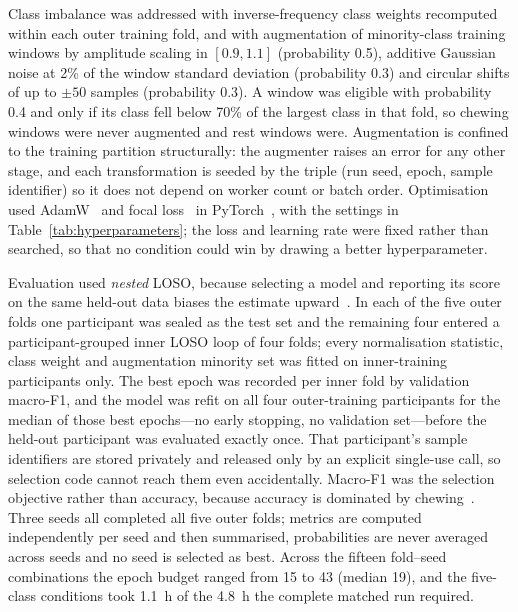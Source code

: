 \documentclass[pdflatex,sn-nature,iicol]{sn-jnl}
\begin{document}
Class imbalance was addressed with inverse-frequency class weights recomputed within each outer training fold, and with augmentation of minority-class training windows by amplitude scaling in $[0.9, 1.1]$ (probability 0.5), additive Gaussian noise at 2\% of the window standard deviation (probability 0.3) and circular shifts of up to $\pm50$ samples (probability 0.3). A window was eligible with probability 0.4 and only if its class fell below 70\% of the largest class in that fold, so chewing windows were never augmented and rest windows were. Augmentation is confined to the training partition structurally: the augmenter raises an error for any other stage, and each transformation is seeded by the triple (run seed, epoch, sample identifier) so it does not depend on worker count or batch order. Optimisation used AdamW~\cite{loshchilov2019decoupled} and focal loss~\cite{lin2017focal} in PyTorch~\cite{paszke2019pytorch}, with the settings in Table~\ref{tab:hyperparameters}; the loss and learning rate were fixed rather than searched, so that no condition could win by drawing a better hyperparameter.

Evaluation used \emph{nested} LOSO, because selecting a model and reporting its score on the same held-out data biases the estimate upward~\cite{cawley2010overfitting,varma2006bias}. In each of the five outer folds one participant was sealed as the test set and the remaining four entered a participant-grouped inner LOSO loop of four folds; every normalisation statistic, class weight and augmentation minority set was fitted on inner-training participants only. The best epoch was recorded per inner fold by validation macro-F1, and the model was refit on all four outer-training participants for the median of those best epochs---no early stopping, no validation set---before the held-out participant was evaluated exactly once. That participant's sample identifiers are stored privately and released only by an explicit single-use call, so selection code cannot reach them even accidentally. Macro-F1 was the selection objective rather than accuracy, because accuracy is dominated by chewing~\cite{chicco2020advantages}. Three seeds all completed all five outer folds; metrics are computed independently per seed and then summarised, probabilities are never averaged across seeds and no seed is selected as best. Across the fifteen fold--seed combinations the epoch budget ranged from 15 to 43 (median 19), and the five-class conditions took 1.1~h of the 4.8~h the complete matched run required.
\end{document}
